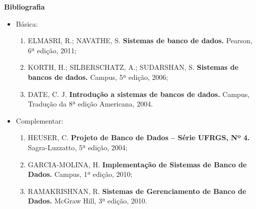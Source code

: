 



\begin{snugshade}\begin{center}\textbf{
    Bibliografia
}\end{center}\end{snugshade}

\begin{itemize} 
  \item Básica:
	\begin{enumerate}
	\item 	ELMASRI, R.; NAVATHE, S. \textbf{Sistemas de banco de dados.} Pearson, 6ª edição, 2011;
	\item 	KORTH, H.; SILBERSCHATZ, A.; SUDARSHAN, S. \textbf{Sistemas de bancos de dados.} Campus, 5ª edição, 2006;
	\item 	DATE, C. J. \textbf{Introdução a sistemas de bancos de dados.} Campus, Tradução da 8ª edição Americana, 2004.      
	\end{enumerate}
  \item Complementar:
	\begin{enumerate} 
	\item 	HEUSER, C. \textbf{Projeto de Banco de Dados – Série UFRGS, Nº 4.} Sagra-Luzzatto, 5ª edição, 2004;
	\item 	GARCIA-MOLINA, H. \textbf{Implementação de Sistemas de Banco de Dados.} Campus, 1ª edição, 2010;
    \item 	RAMAKRISHNAN, R. \textbf{Sistemas de Gerenciamento de Banco de Dados.} McGraw Hill, 3ª edição, 2010.
	\end{enumerate}
\end{itemize}
